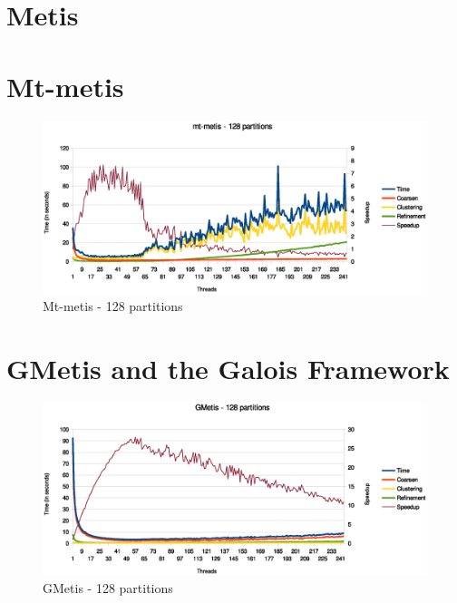 \documentclass[abstract=on,9pt,twocolumn]{scrartcl}
\begin{document}

\section{Metis}
\label{sec:metis}



\section{Mt-metis}
\label{sec:mt-metis}

\begin{center}
\begin{figure}[htb]
    \includegraphics[width=\columnwidth]{img/mtmetis128.eps}
    \caption{Mt-metis - 128 partitions}
    \label{img:mtmetis128}
\end{figure}
\end{center}



\section{GMetis and the Galois Framework} %

\begin{center}
\begin{figure}[htb]
    \includegraphics[width=\columnwidth]{img/gmetis128.eps}
    \caption{GMetis - 128 partitions}
    \label{gmetis128}
\end{figure}
\end{center}
\end{document}
